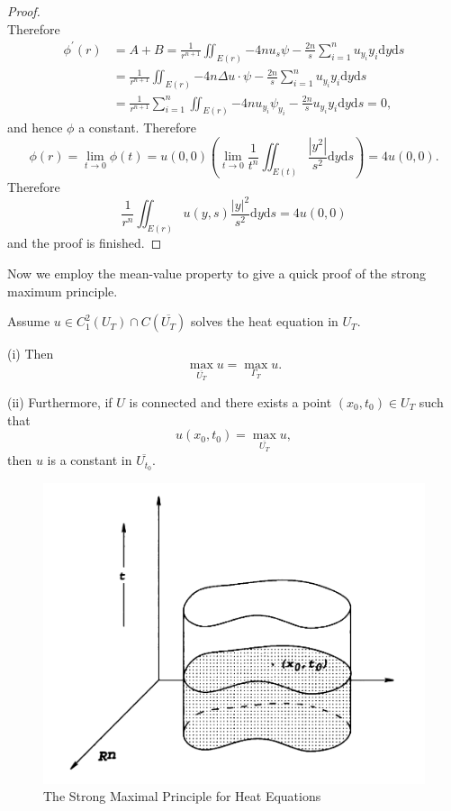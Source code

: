 \begin{proof}
$$$$
Therefore 
$$
\begin{aligned}
\phi ^{\prime}\left( r \right) &=A+B=\frac{1}{r^{n+1}}\iint_{E\left( r \right)}{-4nu_s\psi -\frac{2n}{s}\sum_{i=1}^n{u_{y_i}y_i}\mathrm{d}y\mathrm{d}s}
\\
&=\frac{1}{r^{n+1}}\iint_{E\left( r \right)}{-4n\Delta u\cdot \psi -\frac{2n}{s}\sum_{i=1}^n{u_{y_i}y_i}\mathrm{d}y\mathrm{d}s}
\\
&=\frac{1}{r^{n+1}}\sum_{i=1}^n{\iint_{E\left( r \right)}{-4nu_{y_i}\psi _{y_i}-\frac{2n}{s}u_{y_i}y_i\mathrm{d}y\mathrm{d}s}}=0,
\end{aligned}
$$
and hence $\phi$ a constant. Therefore 
$$
\phi \left( r \right) =\lim_{t\rightarrow 0} \phi \left( t \right) =u\left( 0,0 \right) \left( \lim_{t\rightarrow 0} \frac{1}{t^n}\iint_{E\left( t \right)}{\frac{\left| y^2 \right|}{s^2}\mathrm{d}y\mathrm{d}s} \right) =4u\left( 0,0 \right) .
$$
Therefore 
$$
\frac{1}{r^n}\iint_{E\left( r \right)}{u\left( y,s \right) \frac{\left| y \right|^2}{s^2}\mathrm{d}y\mathrm{d}s}=4u\left( 0,0 \right) 
$$
and the proof is finished.
\end{proof}
Now we employ the mean-value property to give a quick proof of the strong maximum principle.
\begin{theorem}\label{Thm1.3.6}
Assume $u\in C_1^2(U_T)\cap C(\overline{U_T})$ solves the heat equation in $U_T$.\par
(i) Then 
$$
\max_{\overline{U_T}} u=\max_{\Gamma _T} u.
$$\par
(ii) Furthermore, if $U$ is connected and there exists a point $(x_0,t_0)\in U_T$ such that 
$$
u\left( x_0,t_0 \right) =\max_{\overline{U_T}} u,
$$
then $u$ is a constant in $\overline{U_{t_0}}$.
\end{theorem}
\begin{figure}[htbp]
    \center
    \includegraphics[scale=0.24]{Image/Strong Maximum Principle.png}
    \caption{The Strong Maximal Principle for Heat Equations}
\end{figure}
